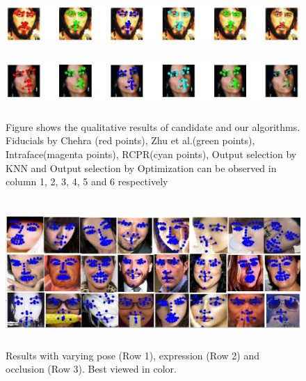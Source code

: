 \begin{figure}
  \includegraphics[width=6in, height=0.8in]{fid/figures/qualitative/9.jpg}
  \includegraphics[width=6in, height=0.8in]{fid/figures/qualitative/10.jpg}
  \caption{Figure shows the qualitative results of candidate and our algorithms. Fiducials by Chehra\cite{asthanaCVPR14_Chehra} (red points), Zhu et al.\cite{xhuCVPR12_wild}(green points), Intraface\cite{xiongCVPR13_SDM}(magenta points), RCPR\cite{artizzzuICCV13_COFW}(cyan points), Output selection by KNN and Output selection by Optimization can be observed in column 1, 2, 3, 4, 5 and 6 respectively}
  \label{fig:qualitative_result}
\end{figure}

\begin{figure}
  \centering
  \includegraphics[width=6in,height=2.2in]{fid/figures/pose_expression_occlusion.png}
  \caption{Results with varying pose (Row 1), expression (Row 2) and 
  occlusion (Row 3). Best viewed in color.}
  \label{fig:sample_results}
\end{figure}

\label{subsec:quant}

